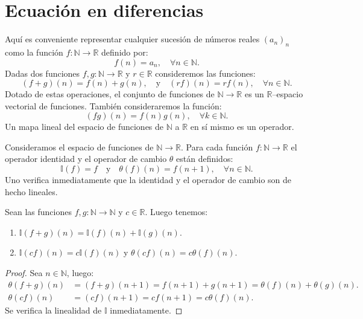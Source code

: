 \section{Ecuación en diferencias}\label{sec:difference}

Aquí es conveniente representar cualquier sucesión de números reales $(a_{n})_{n} $ como la función $f\colon\mathds{N}\rightarrow\mathds{R}$ definido por: \[ f(n)=a_{n},\quad\forall n\in\mathds{N}. \] Dadas dos funciones $f,g\colon\mathds{N}\rightarrow\mathds{R}$ y $r\in\mathds{R} $ consideremos las funciones: \[ (f+g)(n)=f(n)+g(n),\quad\text{y}\quad(rf)(n)=rf(n),\quad\forall n\in\mathds{N}. \] Dotado de estas operaciones, el conjunto de funciones de $\mathds{N}\rightarrow\mathds{R}$ es un $\mathds{R}$--espacio vectorial de funciones. También consideraremos la función: \[ (fg)(n)=f(n)g(n),\quad\forall k\in\mathbb{N}. \] Un mapa lineal del espacio de funciones de $\mathds{N}$ a $ \mathds{R}$ en sí mismo es un operador.

\begin{definition}
Consideramos el espacio de funciones de $\mathds{N}\to\mathds{R}$. Para cada función $f\colon\mathds{N}\rightarrow\mathds{R}$ el operador identidad y el operador de cambio $\theta$ están definidos: \[ \mathds{I}(f)=f\quad\text{y}\quad\theta(f)(n)=f(n+1),\quad\forall n\in\mathds{N}. \] Uno verifica inmediatamente que la identidad y el operador de cambio son de hecho lineales.
\end{definition}

\begin{proposition}
Sean las funciones $f,g\colon\mathds{N}\to\mathds{N}$ y $c\in\mathds{R}$. Luego tenemos:
\begin{enumerate}
	\item $\mathds{I}\left(f+g\right)(n)=\mathds{I}(f)(n)+\mathds{I}(g)(n)$.
	\item $\mathds{I}\left(cf\right)(n)=c\mathds{I}(f)(n)$ y $\theta\left(cf\right)(n)=c\theta(f)(n)$.
\end{enumerate}
\end{proposition}

\begin{proof}
	Sea $n\in\mathds{N}$, luego:
	\begin{align*}
	\theta(f+g)(n)&=(f+g)(n+1)=f(n+1)+g(n+1)=\theta(f)(n)+\theta(g)(n).\\
	\theta(cf)(n)&=(cf)(n+1)=cf(n+1)=c\theta(f)(n).
	\end{align*}
	Se verifica la linealidad de $\mathds{I}$ inmediatamente.
\end{proof}

